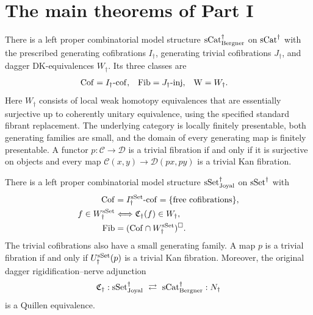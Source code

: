 \section{The main theorems of Part I}
\label{sec:main}

\begin{resultblock}
\begin{theorem}
There is a left proper combinatorial model structure $\mathrm{sCat}^{\dag}_{\mathrm{Bergner}}$ on $\mathrm{sCat}^{\dag}$ with the prescribed generating cofibrations $I_{\dag}$, generating trivial cofibrations $J_{\dag}$, and dagger DK-equivalences $W_{\dag}$.
Its three classes are
\begin{align}
\mathrm{Cof}&=I_{\dag}\text{-}\mathrm{cof},&
\mathrm{Fib}&=J_{\dag}\text{-}\mathrm{inj},&
\mathrm{W}&=W_{\dag}.
\end{align}
Here $W_{\dag}$ consists of local weak homotopy equivalences that are essentially surjective up to coherently unitary equivalence, using the specified standard fibrant replacement.
The underlying category is locally finitely presentable, both generating families are small, and the domain of every generating map is finitely presentable.
A functor $p:\mathcal C\to\mathcal D$ is a trivial fibration if and only if it is surjective on objects and every map
$\mathcal C(x,y)\to\mathcal D(px,py)$ is a trivial Kan fibration.
\end{theorem}
\end{resultblock}

\begin{resultblock}
\begin{theorem}
There is a left proper combinatorial model structure $\mathrm{sSet}^{\dag}_{\mathrm{Joyal}}$ on $\mathrm{sSet}^{\dag}$ with
\begin{align}
\mathrm{Cof}&=I^{\mathrm{sSet}}_{\dag}\text{-}\mathrm{cof}=\{\text{free cofibrations}\},\\
f\in W^{\mathrm{sSet}}_{\dag}&\Longleftrightarrow\mathfrak{C}_{\dag}(f)\in W_{\dag},\\
\mathrm{Fib}&=(\mathrm{Cof}\cap W^{\mathrm{sSet}}_{\dag})^{\square}.
\end{align}
The trivial cofibrations also have a small generating family.
A map $p$ is a trivial fibration if and only if $U_{\dag}^{\mathrm{sSet}}(p)$ is a trivial Kan fibration.
Moreover, the original dagger rigidification--nerve adjunction
\begin{align}
\mathfrak{C}_{\dag}:\mathrm{sSet}^{\dag}_{\mathrm{Joyal}}
\ \rightleftarrows\ \mathrm{sCat}^{\dag}_{\mathrm{Bergner}}:N_{\dag}
\end{align}
is a Quillen equivalence.
\end{theorem}
\end{resultblock}

